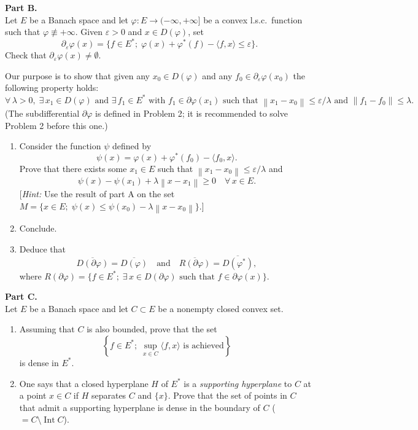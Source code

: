 \documentclass[12pt]{article}
\newcommand{\norm}[1]{\left\|#1\right\|}
\newcommand{\ip}[2]{\langle #1, #2 \rangle}
\begin{document}
\noindent\textbf{Part B.}\\
Let $E$ be a Banach space and let $\varphi : E \to (-\infty,+\infty]$ be a convex l.s.c.\ function
such that $\varphi \not\equiv +\infty$. Given $\varepsilon > 0$ and $x \in D(\varphi)$, set
\[
\partial_\varepsilon\varphi(x) = \{f \in E^*;\; \varphi(x) + \varphi^*(f) - \ip{f}{x} \le \varepsilon\}.
\]
Check that $\partial_\varepsilon\varphi(x) \neq \emptyset$.

\medskip

\noindent Our purpose is to show that given any $x_0 \in D(\varphi)$ and any
$f_0 \in \partial_\varepsilon\varphi(x_0)$ the following property holds:
\[
\forall\, \lambda > 0,\; \exists\, x_1 \in D(\varphi) \text{ and } \exists\, f_1 \in E^* \text{ with }
f_1 \in \partial\varphi(x_1)
\text{ such that } \norm{x_1 - x_0} \le \varepsilon/\lambda \text{ and } \norm{f_1 - f_0} \le \lambda.
\]
(The subdifferential $\partial\varphi$ is defined in Problem 2; it is recommended to solve Problem 2
before this one.)

\begin{enumerate}
\item Consider the function $\psi$ defined by
\[
\psi(x) = \varphi(x) + \varphi^*(f_0) - \ip{f_0}{x}.
\]
Prove that there exists some $x_1 \in E$ such that $\norm{x_1 - x_0} \le \varepsilon/\lambda$ and
\[
\psi(x) - \psi(x_1) + \lambda\norm{x - x_1} \ge 0 \quad \forall\, x \in E.
\]
[\textit{Hint:} Use the result of part A on the set
$M = \{x \in E;\; \psi(x) \le \psi(x_0) - \lambda\norm{x - x_0}\}$.]

\item Conclude.


\item Deduce that
\[
\overline{D(\partial\varphi)} = \overline{D(\varphi)} \quad \text{and} \quad \overline{R(\partial\varphi)} = \overline{D(\varphi^*)},
\]
where $R(\partial\varphi) = \{f \in E^*;\; \exists\, x \in D(\partial\varphi) \text{ such that } f \in \partial\varphi(x)\}$.
\end{enumerate}

\noindent\textbf{Part C.}\\
Let $E$ be a Banach space and let $C \subset E$ be a nonempty closed convex set.

\begin{enumerate}
\item Assuming that $C$ is also bounded, prove that the set
\[
\left\{f \in E^*;\; \sup_{x \in C} \ip{f}{x} \text{ is achieved}\right\}
\]
is dense in $E^*$.

\noindent[\textit{Hint:} Apply the results of part B to the function $\varphi = I_C$.]

\item One says that a closed hyperplane $H$ of $E^*$ is a \emph{supporting hyperplane} to $C$ at a
point $x \in C$ if $H$ separates $C$ and $\{x\}$. Prove that the set of points in $C$ that admit
a supporting hyperplane is dense in the boundary of $C$ ($= C \setminus \operatorname{Int} C$).
\end{enumerate}
\end{document}
